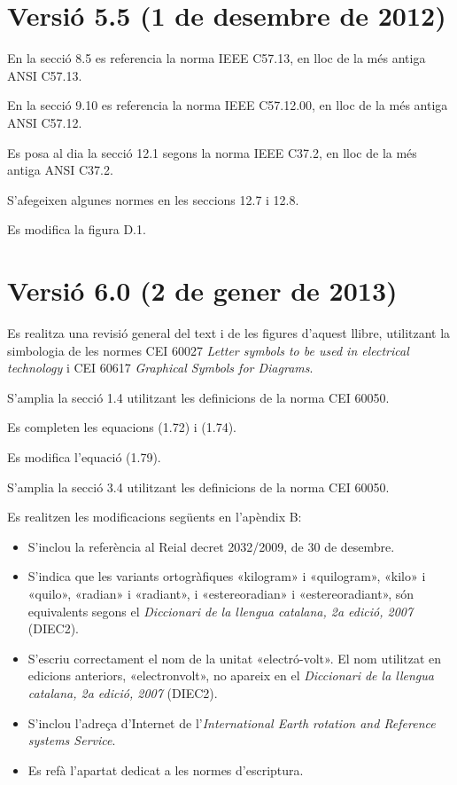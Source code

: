 \section*{Versió 5.5 (1 de desembre de 2012)}

En la secció 8.5 es referencia la norma  IEEE C57.13, en lloc de la més antiga ANSI C57.13.

En la secció 9.10 es referencia la norma  IEEE C57.12.00, en lloc de la més antiga ANSI C57.12.

Es posa al dia la secció 12.1 segons la norma IEEE C37.2, en lloc de la més antiga ANSI C37.2.

S'afegeixen algunes normes en les seccions 12.7 i 12.8.

Es modifica  la figura D.1.


\section*{Versió 6.0 (2 de gener de 2013)}

Es realitza una revisió general del text i de les figures d'aquest  llibre, utilitzant la simbologia de les normes CEI 60027  \textit{Letter symbols to be used in electrical technology} i  CEI 60617  \textit{Graphical Symbols for Diagrams}.

S'amplia la secció 1.4 utilitzant les definicions de la norma CEI 60050.

Es completen les equacions (1.72) i (1.74).

Es modifica l'equació (1.79).

S'amplia la secció  3.4 utilitzant les definicions de la norma CEI 60050.

Es realitzen les modificacions següents en l'apèndix B:
\begin{itemize}
   \item  S'inclou la referència al Reial decret 2032/2009, de 30 de desembre.
   \item S'indica que les variants ortogràfiques  «kilogram»
    i «quilogram», «kilo» i «quilo», «radian» i «radiant», i
   «estereoradian» i «estereoradiant», són equivalents segons el   \textit{Diccionari de la llengua catalana, 2a edició, 2007} (DIEC2).
    \item S'escriu correctament el nom de la unitat «electró-volt». El nom  utilitzat en edicions anteriors,   «electronvolt», no apareix en el \textit{Diccionari de la llengua catalana, 2a edició, 2007} (DIEC2).
    \item S'inclou l'adreça d'Internet de l'\textit{International Earth rotation and Reference systems Service}.
     \item Es refà l'apartat dedicat a les normes d'escriptura.
\end{itemize}

